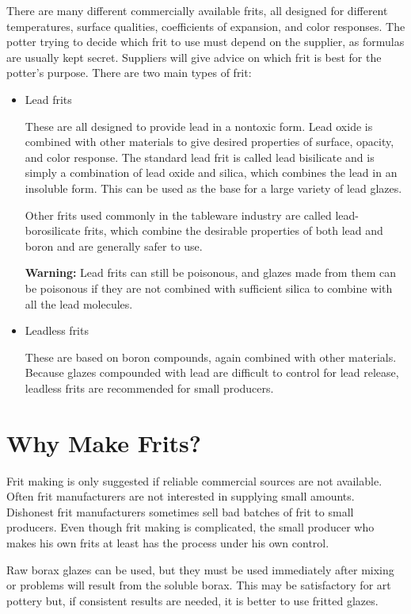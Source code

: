 There are many different commercially available frits, all designed for 
different temperatures, surface qualities, coefficients of expansion, and color 
responses. The potter trying to decide which frit to use must depend on the 
supplier, as formulas are usually kept secret. Suppliers will give advice on 
which frit is best for the potter's purpose. There are two main types of frit:
\begin{itemize}
\item Lead frits

These are all designed to provide lead in a nontoxic form. Lead oxide is 
combined with other materials to give desired properties of surface, opacity, 
and color response. The standard lead frit is called lead bisilicate and is 
simply a combination of lead oxide and silica, which combines the lead in an 
insoluble form. This can be used as the base for a large variety of lead glazes.

Other frits used commonly in the tableware industry are called 
lead-borosilicate frits, which combine the desirable properties of both lead 
and boron and are generally safer to use.

\textbf{Warning:} Lead frits can still be poisonous, and glazes made from them 
can be poisonous if they are not combined with sufficient silica to combine 
with all the lead molecules.

\item Leadless frits

These are based on boron compounds, again combined with other materials. 
Because glazes compounded with lead are difficult to control for lead release, 
leadless frits are recommended for small producers.
\end{itemize}
\section{Why Make Frits?}
Frit making is only suggested if reliable commercial sources are not available. 
Often frit manufacturers are not interested in supplying small amounts. 
Dishonest frit manufacturers sometimes sell bad batches of frit to small 
producers. Even though frit making is complicated, the small producer who makes 
his own frits at least has the process under his own control.

Raw borax glazes can be used, but they must be used immediately after mixing or 
problems will result from the soluble borax. This may be satisfactory for art 
pottery but, if consistent results are needed, it is better to use fritted 
glazes.

